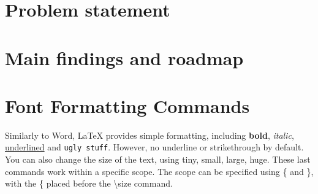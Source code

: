 \section{Problem statement}

\section{Main findings and roadmap}

\section{Font Formatting Commands}
Similarly to Word, LaTeX provides simple formatting, including \textbf{bold}, \textit{italic}, \underline{underlined} and \texttt{ugly stuff}.
However, no underline or strikethrough by default.
You can also change the size of the text, using {\tiny tiny}, {\small small}, {\large large}, {\huge huge}.
These last commands work within a specific scope.
The scope can be specified using \{ and \}, with the \{ placed before the \textbackslash{}size command.

